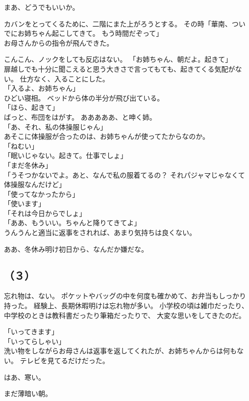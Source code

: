 \documentclass[../IHMain]{subfiles}
\begin{document}
まあ、どうでもいいか。

カバンをとってくるために、二階にまた上がろうとする。
その時「華南、ついでにお姉ちゃん起こしてきて。
もう時間だぞって」\\
お母さんからの指令が飛んできた。

こんこん、ノックをしても反応はない。
「お姉ちゃん、朝だよ。起きて」\\
扉越しでも十分に聞こえると思う大きさで言ってもても、起きてくる気配がない。
仕方なく、入ることにした。\\
「入るよ、お姉ちゃん」\\
ひどい寝相。
ベッドから体の半分が飛び出ている。\\
「ほら、起きて」\\
ばっと、布団をはがす。
あああああ、と呻く姉。\\
「あ、それ、私の体操服じゃん」\\
あそこに体操服が合ったのは、お姉ちゃんが使ってたからなのか。\\
「ねむい」\\
「眠いじゃない。起きて。仕事でしょ」\\
「まだ冬休み」\\
「うそつかないでよ。あと、なんで私の服着てるの？
それパジャマじゃなくて体操服なんだけど」\\
「使ってなかったから」\\
「使います」\\
「それは今日からでしょ」\\
「ああ、もういい。ちゃんと降りてきてよ」\\
うんうんと適当に返事をされれば、あまり気持ちは良くない。

ああ、冬休み明け初日から、なんだか嫌だな。

\subsection*{\gt（３）}
忘れ物は、ない。
ポケットやバッグの中を何度も確かめて、お弁当もしっかり持った。
経験上、長期休暇明けは忘れ物が多い。
小学校の頃は雑巾だったり、中学校のときは教科書だったり筆箱だったりで、
大変な思いをしてきたのだ。

「いってきます」\\
「いってらしゃい」\\
洗い物をしながらお母さんは返事を返してくれたが、お姉ちゃんからは何もない。
テレビを見てるだけだった。

はあ、寒い。

まだ薄暗い朝。
\end{document}
